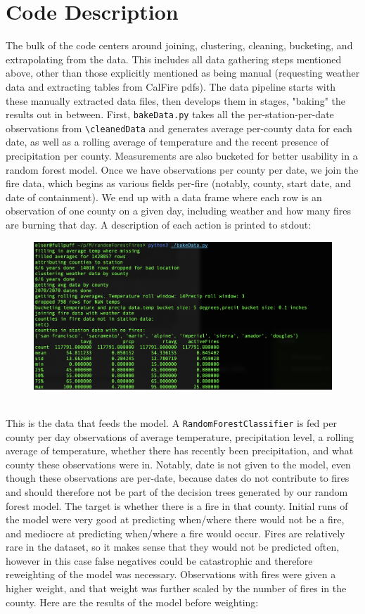 \documentclass{article}
\begin{document}
\section{Code Description}
The bulk of the code centers around joining, clustering, cleaning, bucketing, and extrapolating from the data. This includes all data gathering steps mentioned above, other than those explicitly mentioned as being manual (requesting weather data and extracting tables from CalFire pdfs). The data pipeline starts with these manually extracted data files, then develops them in stages, "baking" the results out in between. First, 
\lstinline|bakeData.py| takes all the per-station-per-date observations from
\lstinline|\cleanedData| and generates average per-county data for each date, as well as a rolling average of temperature and the recent presence of precipitation per county. Measurements are also bucketed for better usability in a random forest model. Once we have observations per county per date, we join the fire data, which begins as various fields per-fire (notably, county, start date, and date of containment). We end up with a data frame where each row is an observation of one county on a given day, including weather and how many fires are burning that day. A description of each action is printed to stdout:
\begin{figure}[h]
	\includegraphics[width=\linewidth]{images/bakeDataScreenshot.png}
\end{figure}
\\
This is the data that feeds the model. A \lstinline|RandomForestClassifier| is fed per county per day observations of average temperature, precipitation level, a rolling average of temperature, whether there has recently been precipitation, and what county these observations were in. Notably, date is not given to the model, even though these observations are per-date, because dates do not contribute to fires and should therefore not be part of the decision trees generated by our random forest model. The target is whether there is a fire in that county. Initial runs of the model were very good at predicting when/where there would not be a fire, and mediocre at predicting when/where a fire would occur. Fires are relatively rare in the dataset, so it makes sense that they would not be predicted often, however in this case false negatives could be catastrophic and therefore reweighting of the model was necessary. Observations with fires were given a higher weight, and that weight was further scaled by the number of fires in the county. Here are the results of the model before weighting:
\end{document}
